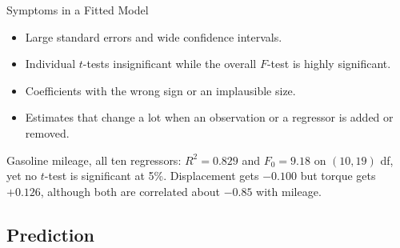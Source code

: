 

\begin{frame}{Symptoms in a Fitted Model}
    \begin{itemize}
        \item Large standard errors and wide confidence intervals.
        \item Individual $t$-tests insignificant while the overall $F$-test is highly significant.
        \item Coefficients with the wrong sign or an implausible size.
        \item Estimates that change a lot when an observation or a regressor is added or removed.
    \end{itemize}
    \svspace{0.5em}
    Gasoline mileage, all ten regressors: $R^2=0.829$ and $F_0=9.18$ on $(10,19)$ df, yet no $t$-test is significant at 5\%. Displacement gets $-0.100$ but torque gets $+0.126$, although both are correlated about $-0.85$ with mileage.
\end{frame}


\subsection{Prediction}


